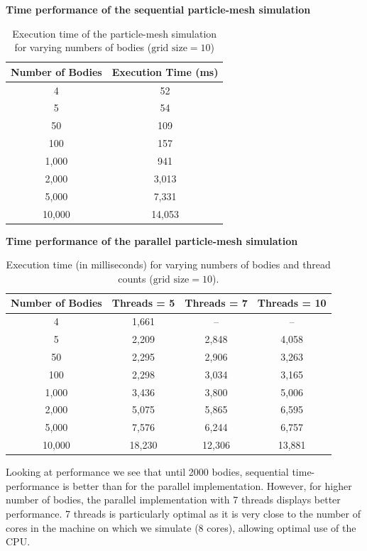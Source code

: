 \documentclass{article}
\begin{document}
\textbf{Time performance of the sequential particle-mesh simulation}
\begin{table}[ht]
\centering
\begin{tabular}{|c|c|}
\hline
\textbf{Number of Bodies} & \textbf{Execution Time (ms)} \\
\hline
4      & 52   \\
5      & 54   \\
50     & 109  \\
100    & 157  \\
1,000  & 941  \\
2,000  & 3,013 \\
5,000  & 7,331 \\
10,000 & 14,053 \\
\hline
\end{tabular}
\caption{Execution time of the particle-mesh simulation for varying numbers of bodies ($\text{grid size} = 10$)}
\label{tab:performance}
\end{table}

\textbf{Time performance of the parallel particle-mesh simulation}
\begin{table}[htbp]
\centering
\begin{tabular}{|c|c|c|c|}
\hline
\textbf{Number of Bodies} & \textbf{Threads = 5} & \textbf{Threads = 7} & \textbf{Threads = 10} \\
\hline
4     & 1,661  & --    & --     \\
5     & 2,209  & 2,848  & 4,058   \\
50    & 2,295  & 2,906  & 3,263   \\
100   & 2,298  & 3,034  & 3,165   \\
1,000  & 3,436  & 3,800  & 5,006   \\
2,000  & 5,075  & 5,865  & 6,595   \\
5,000  & 7,576  & 6,244  & 6,757   \\
10,000 & 18,230 & 12,306 & 13,881  \\
\hline
\end{tabular}
\caption{Execution time (in milliseconds) for varying numbers of bodies and thread counts ($\text{grid size} = 10$).}
\label{tab:thread_performance}
\end{table}

Looking at performance we see that until 2000 bodies, sequential time-performance is better than for the parallel implementation. However, for higher number of bodies, the parallel implementation with 7 threads displays better performance. 7 threads is particularly optimal as it is very close to the number of cores in the machine on which we simulate (8 cores), allowing optimal use of the CPU.  
\end{document}

